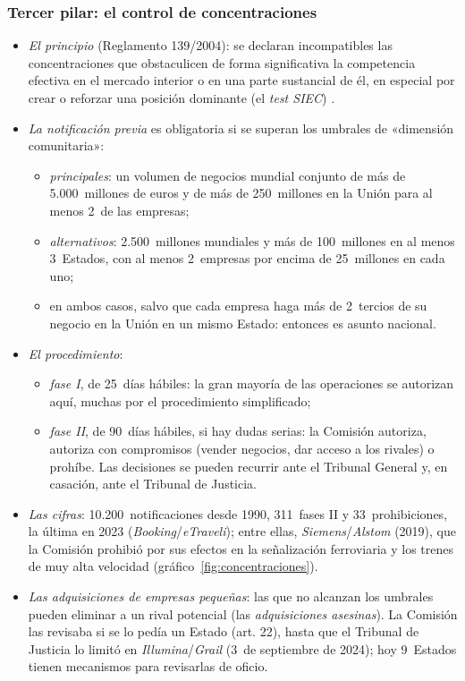 \documentclass[11pt]{article}
\begin{document}
\subsubsection{Tercer pilar: el control de concentraciones}\label{sec:concentraciones}

\begin{itemize}
\item \emph{El principio} (Reglamento 139/2004): se declaran incompatibles las concentraciones que obstaculicen de forma significativa la competencia efectiva en el mercado interior o en una parte sustancial de él, en especial por crear o reforzar una posición dominante (el \emph{test SIEC}) \nocite{UE2004Reglamento139}.
\item \emph{La notificación previa} es obligatoria si se superan los umbrales de «dimensión comunitaria»:
  \begin{itemize}
  \item \emph{principales}: un volumen de negocios mundial conjunto de más de 5.000~millones de euros y de más de 250~millones en la Unión para al menos 2~de las empresas;
  \item \emph{alternativos}: 2.500~millones mundiales y más de 100~millones en al menos 3~Estados, con al menos 2~empresas por encima de 25~millones en cada uno;
  \item en ambos casos, salvo que cada empresa haga más de 2~tercios de su negocio en la Unión en un mismo Estado: entonces es asunto nacional.
  \end{itemize}
\item \emph{El procedimiento}:
  \begin{itemize}
  \item \emph{fase I}, de 25~días hábiles: la gran mayoría de las operaciones se autorizan aquí, muchas por el procedimiento simplificado;
  \item \emph{fase II}, de 90~días hábiles, si hay dudas serias: la Comisión autoriza, autoriza con compromisos (vender negocios, dar acceso a los rivales) o prohíbe. Las decisiones se pueden recurrir ante el Tribunal General y, en casación, ante el Tribunal de Justicia.
  \end{itemize}
\item \emph{Las cifras}: 10.200~notificaciones desde 1990, 311~fases II y 33~prohibiciones, la última en 2023 (\emph{Booking}/\emph{eTraveli}); entre ellas, \emph{Siemens}/\emph{Alstom} (2019), que la Comisión prohibió por sus efectos en la señalización ferroviaria y los trenes de muy alta velocidad (gráfico~\ref{fig:concentraciones})\nocite{CE2026Concentraciones}.
\item \emph{Las adquisiciones de empresas pequeñas}: las que no alcanzan los umbrales pueden eliminar a un rival potencial (las \emph{adquisiciones asesinas}). La Comisión las revisaba si se lo pedía un Estado (art. 22), hasta que el Tribunal de Justicia lo limitó en \emph{Illumina}/\emph{Grail} (3~de septiembre de 2024); hoy 9~Estados tienen mecanismos para revisarlas de oficio.
\end{itemize}
\end{document}
